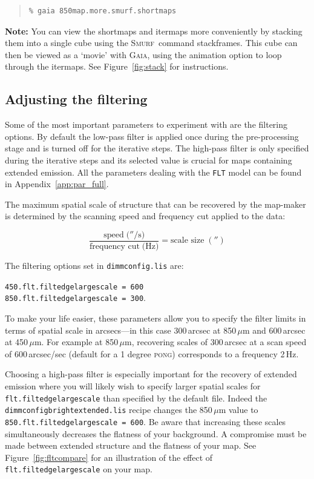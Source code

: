 \documentclass[twoside,11pt]{article}
\newcommand{\htmlref}[2]{#1}
\newcommand{\latexhtml}[2]{#1}
\newcommand{\xref}[3]{#1}
\newcommand{\xlabel}[1]{}
\renewcommand{\_}{\texttt{\symbol{95}}}
\newenvironment{myquote}{\begin{quote}\begin{small}}{\end{small}\end{quote}}
\newcommand{\gaia}{\xref{\textsc{Gaia}}{sun214}{}}
\newcommand{\smurf}{\xref{\textsc{Smurf}}{sun258}{}}
\newcommand{\task}[1]{\textsf{#1}}
\newcommand{\stackframes}{\xref{\task{stackframes}}{sun258}{STACKFRAMES}}
\newcommand{\cref}[3]{\latexhtml{#1~\ref{#2}}{\htmlref{#3}{#2}}}
\begin{document}
\begin{myquote}
\begin{verbatim}
% gaia 850map.more.smurf.shortmaps
\end{verbatim}
\end{myquote}

\textbf{Note:} You can view the shortmaps and itermaps more
conveniently by stacking them into a single cube using the \smurf\
command \stackframes. This cube can then be viewed as a
`movie' with \gaia, using the animation option to loop through the
itermaps. See \cref{Figure}{fig:stack}{the box above} for instructions.

\subsection{\xlabel{filt}Adjusting the filtering}
\label{sec:filt}

Some of the most important parameters to experiment with are the
filtering options. By default the low-pass filter is applied once
during the pre-processing stage and is turned off for the iterative
steps. The high-pass filter is only specified during the iterative
steps and its selected value is crucial for maps containing extended
emission.  All the parameters dealing with the \texttt{FLT} model can
be found in \cref{Appendix}{app:par_full}{Configuration Parameters: dimmconfig.lis}.

The maximum spatial scale of structure that can be recovered by the
map-maker is determined by the scanning speed and frequency cut
applied to the data:

\begin{equation}
\frac{\mbox{speed}\;(''/\mbox{s)}}{\mbox{frequency cut}\;(\mbox{Hz)}}=\mbox{scale size}\;('')
\end{equation}

The filtering options set in \texttt{dimmconfig.lis} are:

\texttt{450.flt.filt\_edge\_largescale = 600} \\
\texttt{850.flt.filt\_edge\_largescale = 300}.

To make your life easier, these parameters allow you to specify the
filter limits in terms of spatial scale in arcsecs---in this case
300\,arcsec at 850\,$\mu$m and 600\,arcsec at 450\,$\mu$m. For example
at 850\,$\mu$m, recovering scales of 300\,arcsec at a scan speed of
600\,arcsec/sec (default for a 1 degree \textsc{pong}) corresponds to
a frequency 2\,Hz.

Choosing a high-pass filter is especially important for the recovery
of extended emission where you will likely wish to specify larger
spatial scales for \texttt{flt.filt\_edge\_largescale} than specified
by the default file. Indeed the
\texttt{dimmconfig\_bright\_extended.lis} recipe changes the
850\,$\mu$m value to \texttt{850.flt.filt\_edge\_largescale = 600}. Be
aware that increasing these scales simultaneously decreases the
flatness of your background. A compromise must be made between
extended structure and the flatness of your map. See
\cref{Figure}{fig:fltcompare}{the figure below} for an illustration of
the effect of \texttt{flt.filt\_edge\_largescale} on your map.
\end{document}
